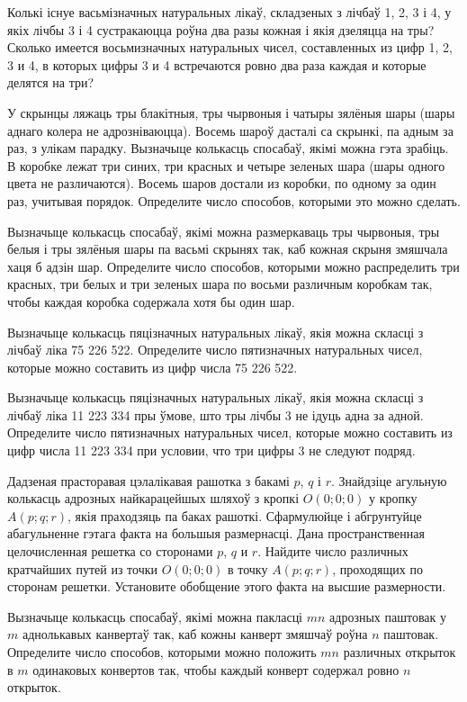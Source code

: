 \begin{problemList}
\bigskip

\problemItemSimple
{Колькі існуе васьмізначных натуральных лікаў, складзеных з лічбаў 1, 2, 3 і 4,
у якіх лічбы 3 і 4 сустракаюцца роўна два разы кожная і якія дзеляцца на тры?}
{Сколько имеется восьмизначных натуральных чисел, составленных
из цифр 1, 2, 3 и 4, в которых цифры 3 и 4 встречаются ровно
два раза каждая и которые делятся на три?}

\problemItemSimple
{У скрынцы ляжаць тры блакітныя, тры чырвоныя і чатыры зялёныя шары (шары аднаго колера
не адрозніваюцца). Восемь шароў дасталі са скрынкі, па адным за раз, з улікам парадку.
Вызначыце колькасць спосабаў, якімі можна гэта зрабіць.}
{В коробке лежат три синих, три красных и четыре зеленых шара (шары
одного цвета не различаются). Восемь шаров достали из коробки, по одному
за один раз, учитывая порядок. Определите число способов, которыми
это можно сделать.}

\problemItemSimple
{Вызначыце колькасць спосабаў, якімі можна размеркаваць тры чырвоныя, тры белыя і
тры зялёныя шары па васьмі скрынях так, каб кожная скрыня змяшчала хаця б адзін шар.}
{Определите число способов, которыми можно распределить три красных,
три белых и три зеленых шара по восьми различным коробкам так, чтобы
каждая коробка содержала хотя бы один шар.}

\problemItemSimple
{Вызначыце колькасць пяцізначных натуральных лікаў, якія можна скласці
з лічбаў ліка 75\,\,226\,\,522.}
{Определите число пятизначных натуральных чисел, которые можно составить
из цифр числа 75\,\,226\,\,522.}

\problemItemSimple
{Вызначыце колькасць пяцізначных натуральных лікаў, якія можна скласці
з лічбаў ліка 11\,\,223\,\,334 пры ўмове, што тры лічбы 3 не ідуць адна за адной.}
{Определите число пятизначных натуральных чисел, которые можно составить
из цифр числа 11\,\,223\,\,334 при условии, что три цифры 3 не следуют подряд.}

\problemItemSimple
{Дадзеная прасторавая цэлалікавая рашотка з бакамі $p$, $q$ і $r$.
Знайдзіце агульную колькасць адрозных найкарацейшых шляхоў з кропкі $O(0; 0; 0)$ у кропку
$A(p; q; r)$, якія праходзяць па баках рашоткі. Сфармулюйце і абгрунтуйце абагульненне гэтага
факта на большыя размернасці.}
{Дана пространственная целочисленная решетка со сторонами $p$, $q$ и $r$.
Найдите число различных кратчайших путей из точки $O(0; 0; 0)$ в точку
$A(p; q; r)$, проходящих по сторонам решетки. Установите обобщение этого
факта на высшие размерности.}

\problemItemSimple
{Вызначыце колькасць спосабаў, якімі можна пакласці $mn$ адрозных
паштовак у $m$ аднолькавых канвертаў так, каб кожны канверт змяшчаў
роўна $n$ паштовак.}
{Определите число способов, которыми можно положить $mn$ различных
открыток в $m$ одинаковых конвертов так, чтобы каждый конверт содержал
ровно $n$ открыток.}


\end{problemList}
